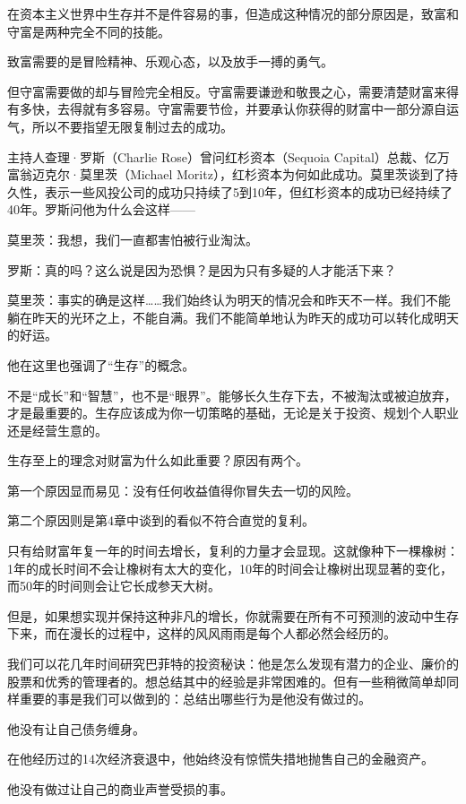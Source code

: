 在资本主义世界中生存并不是件容易的事，但造成这种情况的部分原因是，致富和守富是两种完全不同的技能。

致富需要的是冒险精神、乐观心态，以及放手一搏的勇气。

但守富需要做的却与冒险完全相反。守富需要谦逊和敬畏之心，需要清楚财富来得有多快，去得就有多容易。守富需要节俭，并要承认你获得的财富中一部分源自运气，所以不要指望无限复制过去的成功。

主持人查理·罗斯（Charlie Rose）曾问红杉资本（Sequoia Capital）总裁、亿万富翁迈克尔·莫里茨（Michael Moritz），红杉资本为何如此成功。莫里茨谈到了持久性，表示一些风投公司的成功只持续了5到10年，但红杉资本的成功已经持续了40年。罗斯问他为什么会这样——

{\kaishu

莫里茨：我想，我们一直都害怕被行业淘汰。

罗斯：真的吗？这么说是因为恐惧？是因为只有多疑的人才能活下来？

莫里茨：事实的确是这样……我们始终认为明天的情况会和昨天不一样。我们不能躺在昨天的光环之上，不能自满。我们不能简单地认为昨天的成功可以转化成明天的好运。

}

他在这里也强调了“生存”的概念。

不是“成长”和“智慧”，也不是“眼界”。能够长久生存下去，不被淘汰或被迫放弃，才是最重要的。生存应该成为你一切策略的基础，无论是关于投资、规划个人职业还是经营生意的。

生存至上的理念对财富为什么如此重要？原因有两个。

第一个原因显而易见：没有任何收益值得你冒失去一切的风险。

第二个原因则是第4章中谈到的看似不符合直觉的复利。

只有给财富年复一年的时间去增长，复利的力量才会显现。这就像种下一棵橡树：1年的成长时间不会让橡树有太大的变化，10年的时间会让橡树出现显著的变化，而50年的时间则会让它长成参天大树。

但是，如果想实现并保持这种非凡的增长，你就需要在所有不可预测的波动中生存下来，而在漫长的过程中，这样的风风雨雨是每个人都必然会经历的。

我们可以花几年时间研究巴菲特的投资秘诀：他是怎么发现有潜力的企业、廉价的股票和优秀的管理者的。想总结其中的经验是非常困难的。但有一些稍微简单却同样重要的事是我们可以做到的：总结出哪些行为是他没有做过的。

他没有让自己债务缠身。

在他经历过的14次经济衰退中，他始终没有惊慌失措地抛售自己的金融资产。

他没有做过让自己的商业声誉受损的事。

